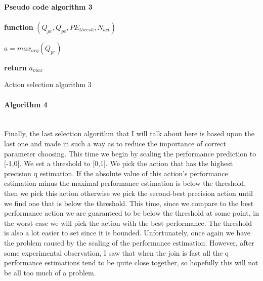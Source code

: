 \paragraph{Pseudo code algorithm 3}
\begin{center}
	\begin{algorithm}

    \textbf{function}  $(Q_{pr},Q_{pe},PE_{thresh},N_{act})$\;
    
    
    \Indp{}\Indm
    \Indp{} \Indm
    \Indp
   	$a=max_{arg}(Q_{pr})$\\
    
   
  
   \textbf{return} $a_{max}$
   
    
\caption{Action selection algorithm 3}
\end{algorithm}
\end{center}
\paragraph{Algorithm 4}\mbox{}\\
Finally, the last selection algorithm that I will talk about here is based upon the last one and made in such a way as to reduce the importance of correct parameter choosing. This time we begin by scaling the performance prediction to [-1,0]. We set a threshold to [0,1]. We pick the action that has the highest precision q estimation. If the absolute value of this action's performance estimation minus the maximal performance estimation is below the threshold, then we pick this action otherwise we pick the second-best precision action until we find one that is below the threshold. This time, since we compare to the best performance action we are guaranteed to be below the threshold at some point, in the worst case we will pick the action with the best performance. The threshold is also a lot easier to set since it is bounded. Unfortunately, once again we have the problem caused by the scaling of the performance estimation. However, after some experimental observation, I saw that when the join is fast all the q performance estimations tend to be quite close together, so hopefully this will not be all too much of a problem.
